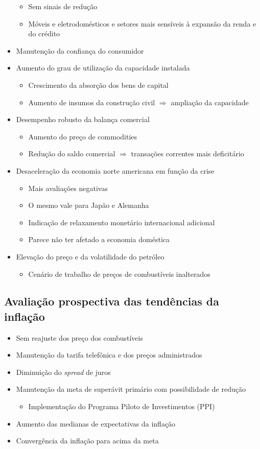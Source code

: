 \documentclass[11pt]{article}
\begin{document}
\begin{itemize}
\begin{itemize}
\item Sem sinais de redução
\item Móveis e eletrodomésticos e setores mais sensíveis à expansão da renda e do crédito
\end{itemize}
\item Manutenção da confiança do consumidor
\item Aumento do grau de utilização da capacidade instalada
\begin{itemize}
\item Crescimento da absorção dos bens de capital
\item Aumento de insumos da construção civil \(\Rightarrow\) ampliação da capacidade
\end{itemize}
\item Desempenho robusto da balança comercial
\begin{itemize}
\item Aumento do preço de commodities
\item Redução do saldo comercial \(\Rightarrow\) transações correntes mais deficitário
\end{itemize}
\item Desaceleração da economia norte americana em função da crise
\begin{itemize}
\item Mais avaliações negativas
\item O mesmo vale para Japão e Alemanha
\item Indicação de relaxamento monetário internacional adicional
\item Parece não ter afetado a economia doméstica
\end{itemize}
\item Elevação do preço e da volatilidade do petróleo
\begin{itemize}
\item Cenário de trabalho de preços de combustíveis inalterados
\end{itemize}
\end{itemize}
\subsection*{Avaliação prospectiva das tendências da inflação}
\label{sec:orgb26cbdf}
\begin{itemize}
\item Sem reajuste dos preço dos combustíveis
\item Manutenção da tarifa telefônica e dos preços administrados
\item Diminuição do \emph{spread} de juros
\item Manutenção da meta de superávit primário com possibilidade de redução
\begin{itemize}
\item Implementação do Programa Piloto de Investimentos (PPI)
\end{itemize}
\item Aumento das medianas de expectativas da inflação
\item Convergência da inflação para acima da meta
\end{itemize}
\end{document}
